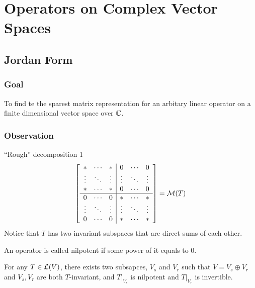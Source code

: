 \section{Operators on Complex Vector Spaces}
\setcounter{subsection}{3}
\subsection{Jordan Form}
\subsubsection*{Goal} To find te the sparest matrix representation for an arbitary linear operator on a finite dimensional vector space over $\mathbb C$.
\subsubsection{Observation}
``Rough'' decomposition 1
\[ \left[\begin{array}{ccc|ccc} 
\ast & \cdots & \ast & 0 & \cdots & 0 \\ 
\vdots & \ddots & \vdots & \vdots & \ddots & \vdots \\ 
\ast & \cdots & \ast & 0 & \cdots & 0 \\
\hline
0 & \cdots & 0  & \ast & \cdots & \ast  \\ 
\vdots & \ddots & \vdots & \vdots & \ddots & \vdots\\ 
0 & \cdots & 0 & \ast & \cdots & \ast \\

          \end{array}\right]  = \mathcal M(T)\]
          Notice that $T$ has two invariant subspaces that are direct sums of each other.
\begin{definition}
	An operator is called nilpotent if some power of it equals to $0$.
\end{definition}
\begin{proposition}
	For any $T \in \mathcal L(V)$, there exists two subsapces, $V_s$ and $V_r$ such that $V = V_s \oplus V_r$ and $V_s,V_r$ are both $T$-invariant, and $T\vert_{V_s}$ is nilpotent and $T\vert_{V_r}$ is invertible. 
\end{proposition}

